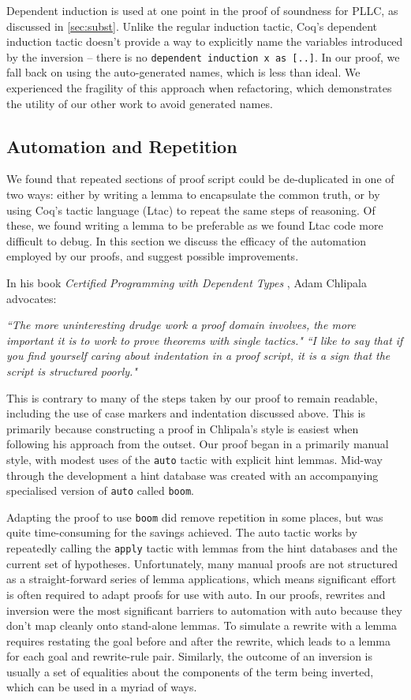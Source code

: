 \documentclass[]{unswthesis}
\let\c\texttt
\let\i\textit
\begin{document}
Dependent induction is used at one point in the proof of soundness for PLLC, as discussed in \cref{sec:subst}. Unlike the regular induction tactic, Coq's dependent induction tactic doesn't provide a way to explicitly name the variables introduced by the inversion -- there is no \c{dependent induction x as [..]}. In our proof, we fall back on using the auto-generated names, which is less than ideal. We experienced the fragility of this approach when refactoring, which demonstrates the utility of our other work to avoid generated names.

\subsection{Automation and Repetition}

We found that repeated sections of proof script could be de-duplicated in one of two ways: either by writing a lemma to encapsulate the common truth, or by using Coq's tactic language (Ltac) to repeat the same steps of reasoning. Of these, we found writing a lemma to be preferable as we found Ltac code more difficult to debug. In this section we discuss the efficacy of the automation employed by our proofs, and suggest possible improvements.

In his book \i{Certified Programming with Dependent Types} \cite{cpdt}, Adam Chlipala advocates:

\i{``The more uninteresting drudge work a proof domain involves, the more important it is to work to prove theorems with single tactics."}
\i{``I like to say that if you find yourself caring about indentation in a proof script, it is a sign that the script is structured poorly."}

This is contrary to many of the steps taken by our proof to remain readable, including the use of case markers and indentation discussed above. This is primarily because constructing a proof in Chlipala's style is easiest when following his approach from the outset. Our proof began in a primarily manual style, with modest uses of the \c{auto} tactic with explicit hint lemmas. Mid-way through the development a hint database was created with an accompanying specialised version of \c{auto} called \c{boom}.

Adapting the proof to use \c{boom} did remove repetition in some places, but was quite time-consuming for the savings achieved. The auto tactic works by repeatedly calling the \c{apply} tactic with lemmas from the hint databases and the current set of hypotheses. Unfortunately, many manual proofs are not structured as a straight-forward series of lemma applications, which means significant effort is often required to adapt proofs for use with auto. In our proofs, rewrites and inversion were the most significant barriers to automation with auto because they don't map cleanly onto stand-alone lemmas. To simulate a rewrite with a lemma requires restating the goal before and after the rewrite, which leads to a lemma for each goal and rewrite-rule pair. Similarly, the outcome of an inversion is usually a set of equalities about the components of the term being inverted, which can be used in a myriad of ways.
\end{document}
